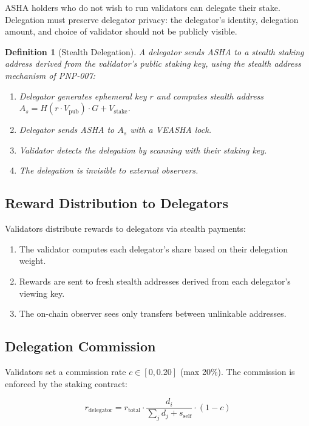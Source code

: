 \documentclass[11pt,a4paper]{article}
\newtheorem{definition}{Definition}[section]
\begin{document}
ASHA holders who do not wish to run validators can delegate their stake.
Delegation must preserve delegator privacy: the delegator's identity,
delegation amount, and choice of validator should not be publicly
visible.

\begin{definition}[Stealth Delegation]
    A delegator sends ASHA to a stealth staking address derived from
    the validator's public staking key, using the stealth address
    mechanism of PNP-007:
    \begin{enumerate}[label=(\roman*)]
        \item Delegator generates ephemeral key $r$ and computes
        stealth address $A_s = H(r \cdot V_{\mathrm{pub}}) \cdot G +
        V_{\mathrm{stake}}$.
        \item Delegator sends ASHA to $A_s$ with a VEASHA lock.
        \item Validator detects the delegation by scanning with their
        staking key.
        \item The delegation is invisible to external observers.
    \end{enumerate}
\end{definition}

\subsection{Reward Distribution to Delegators}

Validators distribute rewards to delegators via stealth payments:

\begin{enumerate}
    \item The validator computes each delegator's share based on their
    delegation weight.
    \item Rewards are sent to fresh stealth addresses derived from each
    delegator's viewing key.
    \item The on-chain observer sees only transfers between unlinkable
    addresses.
\end{enumerate}

\subsection{Delegation Commission}

Validators set a commission rate $c \in [0, 0.20]$ (max 20\%).  The
commission is enforced by the staking contract:

\[
    r_{\mathrm{delegator}} = r_{\mathrm{total}} \cdot
    \frac{d_i}{\sum_j d_j + s_{\mathrm{self}}} \cdot (1 - c)
\]
\end{document}
